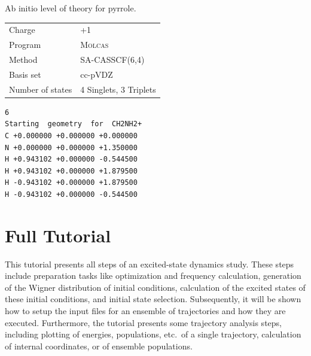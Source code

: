 \documentclass[a4paper,11pt,DIV=15,openany]{scrbook}
\newenvironment{example}{
  \vspace{0mm}
  \definecolor{shadecolor}{HTML}{E4F4FF}
  \begin{shaded}
}{
  \end{shaded}
}
\begin{document}
\begin{example}
\begin{minipage}{0.45\textwidth}
  \centering
  Ab initio level of theory for pyrrole.
  \begin{tabular}{ll}
    \toprule
    Charge              &+1\\
    Program             &\textsc{Molcas}\\
    Method              &SA-CASSCF(6,4)\\
    Basis set           &cc-pVDZ\\
    Number of states    &4 Singlets, 3 Triplets\\
    \bottomrule
  \end{tabular}
\end{minipage}
\hfill
\begin{minipage}{0.45\textwidth}
  \begin{verbatim}
6
Starting  geometry  for  CH2NH2+
C +0.000000 +0.000000 +0.000000
N +0.000000 +0.000000 +1.350000
H +0.943102 +0.000000 -0.544500
H +0.943102 +0.000000 +1.879500
H -0.943102 +0.000000 +1.879500
H -0.943102 +0.000000 -0.544500
\end{verbatim}
\end{minipage}
\end{example}









\chapter{Full Tutorial}\label{chap:full}

This tutorial presents all steps of an excited-state dynamics study. 
These steps include preparation tasks like optimization and frequency calculation, generation of the Wigner distribution of initial conditions, calculation of the excited states of these initial conditions, and initial state selection. 
Subsequently, it will be shown how to setup the input files for an ensemble of trajectories and how they are executed.
Furthermore, the tutorial presents some trajectory analysis steps, including plotting of energies, populations, etc.\ of a single trajectory, calculation of internal coordinates, or of ensemble populations.
\end{document}
